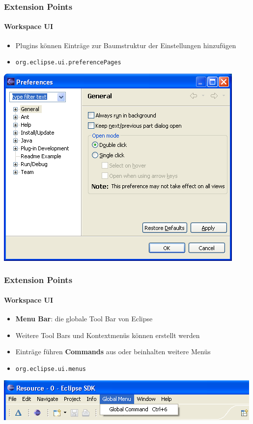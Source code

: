 {\begin{frame}
  \frametitle{Extension Points}
  \framesubtitle{Workspace UI}
  \begin{itemize}
    \item Plugins können Einträge zur Baumstruktur der Einstellungen hinzufügen
    \item \texttt{org.eclipse.ui.preferencePages}
  \end{itemize}
  \includegraphics[scale=0.3]{images/preference.png}    
\end{frame}

\begin{frame}
  \frametitle{Extension Points}
  \framesubtitle{Workspace UI}
  \begin{itemize}
    \item \textbf{Menu Bar}: die globale Tool Bar von Eclipse
    \item Weitere Tool Bars und Kontextmenüs können erstellt werden
    \item Einträge führen \textbf{Commands} aus oder beinhalten weitere Menüs
    \item \texttt{org.eclipse.ui.menus}
  \end{itemize}  
  \includegraphics[scale=0.4]{images/toolbar.png}    
\end{frame}

}
